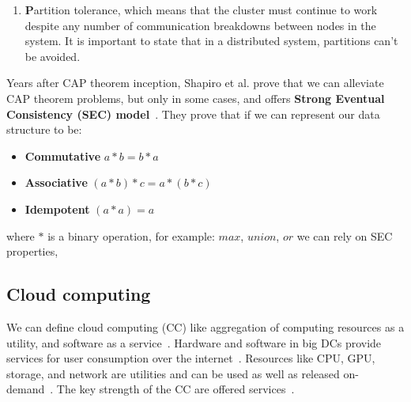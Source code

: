 \begin{enumerate} [start=1,label={(\bfseries \arabic*)}]
	We can calculate availability class if we have system availability $A$, the system's availability class is define as~\cite{GrayS91}: 
	
	\begin{equation} 
		e^{\log_{10} \frac{1}{ (1 - A)}} 
	\end{equation}
	It is important to notice that even a 99\% available system gives almost four days of downtime in a year, which is unacceptable for services like Facebook, Google, AWS etc. And when service is down, companies are loosing customers.
	\item \textbf{P}artition tolerance, which means that the cluster must continue to work despite any number of communication breakdowns between nodes in the system. It is important to state that in a distributed system, partitions can’t be avoided.
\end{enumerate}

Years after CAP theorem inception, Shapiro et al. prove that we can alleviate CAP theorem problems, but only in some cases, and offers \textbf{Strong Eventual Consistency (SEC) model}~\cite{ShapiroPBZ11}. They prove that if we can represent our data structure to be: \label{crdts}

\begin{itemize}
	\item \textbf{Commutative} $a*b = b*a$ 
	\item \textbf{Associative} $(a*b)*c = a*(b*c)$ 
	\item \textbf{Idempotent} $(a * a) = a$ 
\end{itemize}

\noindent
where $*$ is a binary operation, for example: $max$, $union$, $or$ we can rely on SEC properties,
%
%
\subsection{Cloud computing}\label{sec:cloud_computing}
%
We can define cloud computing (CC) like aggregation of computing resources as a utility, and software as a service~\cite{Vogels}. Hardware and software in big DCs provide services for user consumption over the internet~\cite{AboveTheCloud}. Resources like CPU, GPU, storage, and network are utilities and can be used as well as released on-demand~\cite{ZhangCB10}. The key strength of the CC are offered services~\cite{Vogels}. 

